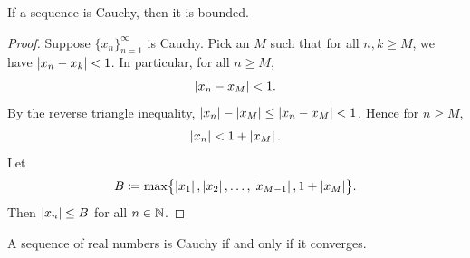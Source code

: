 %

\begin{prop}
If a sequence is Cauchy, then it is bounded.
\end{prop}

\begin{proof}
Suppose $\{ x_n \}_{n=1}^\infty$ is Cauchy.  Pick an $M$ such that for all
$n,k \geq M$, we have $\left\lvert {x_n-x_k} \right\rvert < 1$.  In particular, 
for all $n \geq M$,
\begin{equation*}
\left\lvert {x_n - x_M} \right\rvert < 1 .
\end{equation*}
By the reverse triangle inequality,
$\left\lvert {x_n} \right\rvert - \left\lvert {x_M} \right\rvert \leq \left\lvert {x_n - x_M} \right\rvert < 1$.  Hence for $n \geq M$,
\begin{equation*}
\left\lvert {x_n} \right\rvert < 1 + \left\lvert {x_M} \right\rvert.
\end{equation*}
Let
\begin{equation*}
B \coloneqq \max \bigl\{ \left\lvert {x_1} \right\rvert, \left\lvert {x_2} \right\rvert, \ldots, \left\lvert {x_{M-1}} \right\rvert, 1+ \left\lvert {x_M} \right\rvert \bigr\} .
\end{equation*}
Then $\left\lvert {x_n} \right\rvert \leq B$ for all $n \in {\mathbb{N}}$.
\end{proof}

\begin{thm}
A sequence of real numbers is Cauchy if and only if it converges.
\end{thm}

